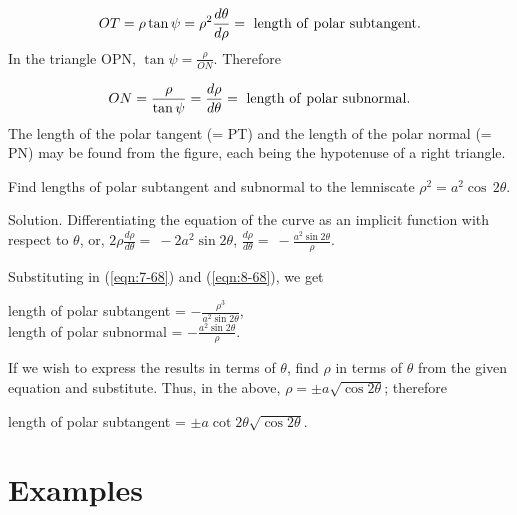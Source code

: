 \begin{equation}
OT = \rho \tan \psi = \rho^2 \frac{d\theta}{d\rho} 
=\ {\rm length\ of\ polar\ subtangent}.
\label{eqn:7-68}
\end{equation}	
In the triangle OPN, $\tan \psi = \frac{\rho}{ON}$. Therefore

\begin{equation}
ON = \frac{\rho}{\tan \psi} = \frac{d\rho}{d\theta} 
=\ {\rm length\ of\ polar\ subnormal}.
\label{eqn:8-68}
\end{equation}
The length of the polar tangent (= PT) and the length of the polar 
normal (= PN) may be found from the figure, each being the hypotenuse 
of a right triangle.

\begin{example}
{\rm
 Find lengths of polar subtangent and subnormal to the lemniscate 
$\rho^2 = a^2\cos\, 2\theta$.

Solution. Differentiating the equation of the curve as an implicit 
function with respect to $\theta$,
or, 
$2 \rho \frac{d\rho}{d\theta} 	=\ - 2 a^2 \sin 2 \theta$,
$\frac{d\rho}{d\theta} 	=\ -\frac{a^2 \sin 2\theta}{\rho}$.

Substituting in (\ref{eqn:7-68}) and (\ref{eqn:8-68}), we get

\begin{center}
length of polar subtangent 	= $- \frac{\rho^3}{a^2 \sin 2\theta}$,
\\
length of polar subnormal 	= $- \frac{a^2 \sin 2\theta}{\rho}$.
\end{center}
If we wish to express the results in terms of $\theta$, find $\rho$ in
terms of $\theta$ from the given equation and substitute. 
Thus, in the above, $\rho = \pm a \sqrt{\cos 2 \theta}$; therefore 

\begin{center}
length of polar subtangent = $\pm a \cot 2 \theta \sqrt{\cos 2 \theta}$.
\end{center}

}
\end{example}

\section{Examples}

